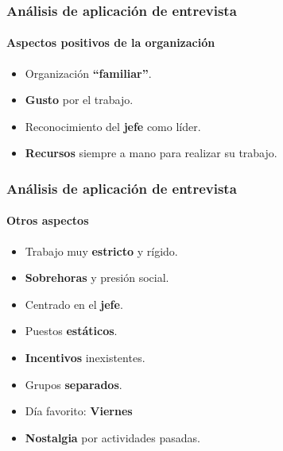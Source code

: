 \frame
{
\frametitle{Análisis de aplicación de entrevista}
\framesubtitle{Aspectos positivos de la organización}
\begin{itemize}
    \item Organización \textbf{``familiar''}.
    \item \textbf{Gusto} por el trabajo.
    \item Reconocimiento del \textbf{jefe} como líder.
    \item \textbf{Recursos} siempre a mano para realizar su trabajo.
\end{itemize}
}

\frame
{
\frametitle{Análisis de aplicación de entrevista}
\framesubtitle{Otros aspectos}
\begin{itemize}
    \item Trabajo muy \textbf{estricto} y rígido.
    \item \textbf{Sobrehoras} y presión social.
    \item Centrado en el \textbf{jefe}.
    \item Puestos \textbf{estáticos}.
    \item \textbf{Incentivos} inexistentes.
    \item Grupos \textbf{separados}.
    \item Día favorito: \textbf{Viernes}
    \item \textbf{Nostalgia} por actividades pasadas.
\end{itemize}
}
